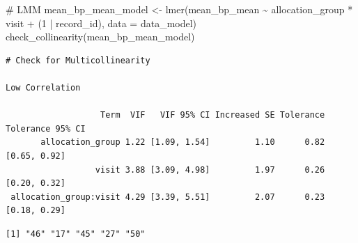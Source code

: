 \documentclass[
  12pt,
]{article}
\newenvironment{Shaded}{\begin{snugshade}}{\end{snugshade}}
\newcommand{\AttributeTok}[1]{\textcolor[rgb]{0.40,0.45,0.13}{#1}}
\newcommand{\CommentTok}[1]{\textcolor[rgb]{0.37,0.37,0.37}{#1}}
\newcommand{\DecValTok}[1]{\textcolor[rgb]{0.68,0.00,0.00}{#1}}
\newcommand{\FunctionTok}[1]{\textcolor[rgb]{0.28,0.35,0.67}{#1}}
\newcommand{\NormalTok}[1]{\textcolor[rgb]{0.00,0.23,0.31}{#1}}
\newcommand{\OtherTok}[1]{\textcolor[rgb]{0.00,0.23,0.31}{#1}}
\newcommand{\SpecialCharTok}[1]{\textcolor[rgb]{0.37,0.37,0.37}{#1}}
\newcommand{\StringTok}[1]{\textcolor[rgb]{0.13,0.47,0.30}{#1}}
\begin{document}
\begin{Shaded}
\begin{Highlighting}[]
\CommentTok{\# LMM}
\NormalTok{mean\_bp\_mean\_model }\OtherTok{\textless{}{-}} \FunctionTok{lmer}\NormalTok{(mean\_bp\_mean }\SpecialCharTok{\textasciitilde{}}\NormalTok{ allocation\_group }\SpecialCharTok{*}\NormalTok{ visit }\SpecialCharTok{+} 
\NormalTok{(}\DecValTok{1} \SpecialCharTok{|}\NormalTok{ record\_id), }\AttributeTok{data =}\NormalTok{ data\_model)}
\FunctionTok{check\_collinearity}\NormalTok{(mean\_bp\_mean\_model)}
\end{Highlighting}
\end{Shaded}

\begin{verbatim}
# Check for Multicollinearity

Low Correlation

                   Term  VIF   VIF 95% CI Increased SE Tolerance Tolerance 95% CI
       allocation_group 1.22 [1.09, 1.54]         1.10      0.82     [0.65, 0.92]
                  visit 3.88 [3.09, 4.98]         1.97      0.26     [0.20, 0.32]
 allocation_group:visit 4.29 [3.39, 5.51]         2.07      0.23     [0.18, 0.29]
\end{verbatim}

\begin{Shaded}
\end{Shaded}

\begin{verbatim}
[1] "46" "17" "45" "27" "50"
\end{verbatim}
\end{document}
